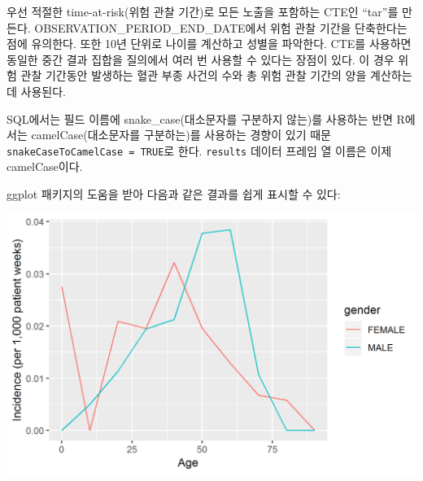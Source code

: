 \documentclass[11pt]{book}
\newenvironment{Shaded}{\begin{snugshade}}{\end{snugshade}}
\newcommand{\KeywordTok}[1]{\textcolor[rgb]{0.13,0.29,0.53}{\textbf{#1}}}
\newcommand{\DataTypeTok}[1]{\textcolor[rgb]{0.13,0.29,0.53}{#1}}
\newcommand{\DecValTok}[1]{\textcolor[rgb]{0.00,0.00,0.81}{#1}}
\newcommand{\StringTok}[1]{\textcolor[rgb]{0.31,0.60,0.02}{#1}}
\newcommand{\CommentTok}[1]{\textcolor[rgb]{0.56,0.35,0.01}{\textit{#1}}}
\newcommand{\OperatorTok}[1]{\textcolor[rgb]{0.81,0.36,0.00}{\textbf{#1}}}
\newcommand{\NormalTok}[1]{#1}
\theoremstyle{definition}
\theoremstyle{definition}
\theoremstyle{definition}
\theoremstyle{remark}
\begin{document}
우선 적절한 time-at-risk(위험 관찰 기간)로 모든 노출을 포함하는 CTE인
``tar''를 만든다. OBSERVATION\_PERIOD\_END\_DATE에서 위험 관찰 기간을
단축한다는 점에 유의한다. 또한 10년 단위로 나이를 계산하고 성별을
파악한다. CTE를 사용하면 동일한 중간 결과 집합을 질의에서 여러 번 사용할
수 있다는 장점이 있다. 이 경우 위험 관찰 기간동안 발생하는 혈관 부종
사건의 수와 총 위험 관찰 기간의 양을 계산하는데 사용된다.

SQL에서는 필드 이름에 snake\_case(대소문자를 구분하지 않는)를 사용하는
반면 R에서는 camelCase(대소문자를 구분하는)를 사용하는 경향이 있기 때문
\texttt{snakeCaseToCamelCase\ =\ TRUE}로 한다. \texttt{results} 데이터
프레임 열 이름은 이제 camelCase이다.

ggplot 패키지의 도움을 받아 다음과 같은 결과를 쉽게 표시할 수 있다:

\begin{Shaded}
\end{Shaded}

\begin{center}\includegraphics[width=0.8\linewidth]{images/SqlAndR/ir} \end{center}
\end{document}
